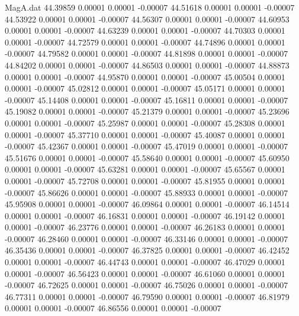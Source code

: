 \begin{filecontents}{MagA.dat}
  44.39859    0.00001    0.00001   -0.00007
  44.51618    0.00001    0.00001   -0.00007
  44.53922    0.00001    0.00001   -0.00007
  44.56307    0.00001    0.00001   -0.00007
  44.60953    0.00001    0.00001   -0.00007
  44.63239    0.00001    0.00001   -0.00007
  44.70303    0.00001    0.00001   -0.00007
  44.72579    0.00001    0.00001   -0.00007
  44.74896    0.00001    0.00001   -0.00007
  44.79582    0.00001    0.00001   -0.00007
  44.81898    0.00001    0.00001   -0.00007
  44.84202    0.00001    0.00001   -0.00007
  44.86503    0.00001    0.00001   -0.00007
  44.88873    0.00001    0.00001   -0.00007
  44.95870    0.00001    0.00001   -0.00007
  45.00504    0.00001    0.00001   -0.00007
  45.02812    0.00001    0.00001   -0.00007
  45.05171    0.00001    0.00001   -0.00007
  45.14408    0.00001    0.00001   -0.00007
  45.16811    0.00001    0.00001   -0.00007
  45.19082    0.00001    0.00001   -0.00007
  45.21379    0.00001    0.00001   -0.00007
  45.23696    0.00001    0.00001   -0.00007
  45.25987    0.00001    0.00001   -0.00007
  45.28308    0.00001    0.00001   -0.00007
  45.37710    0.00001    0.00001   -0.00007
  45.40087    0.00001    0.00001   -0.00007
  45.42367    0.00001    0.00001   -0.00007
  45.47019    0.00001    0.00001   -0.00007
  45.51676    0.00001    0.00001   -0.00007
  45.58640    0.00001    0.00001   -0.00007
  45.60950    0.00001    0.00001   -0.00007
  45.63281    0.00001    0.00001   -0.00007
  45.65567    0.00001    0.00001   -0.00007
  45.72708    0.00001    0.00001   -0.00007
  45.81955    0.00001    0.00001   -0.00007
  45.86626    0.00001    0.00001   -0.00007
  45.88933    0.00001    0.00001   -0.00007
  45.95908    0.00001    0.00001   -0.00007
  46.09864    0.00001    0.00001   -0.00007
  46.14514    0.00001    0.00001   -0.00007
  46.16831    0.00001    0.00001   -0.00007
  46.19142    0.00001    0.00001   -0.00007
  46.23776    0.00001    0.00001   -0.00007
  46.26183    0.00001    0.00001   -0.00007
  46.28460    0.00001    0.00001   -0.00007
  46.33146    0.00001    0.00001   -0.00007
  46.35436    0.00001    0.00001   -0.00007
  46.37825    0.00001    0.00001   -0.00007
  46.42452    0.00001    0.00001   -0.00007
  46.44743    0.00001    0.00001   -0.00007
  46.47029    0.00001    0.00001   -0.00007
  46.56423    0.00001    0.00001   -0.00007
  46.61060    0.00001    0.00001   -0.00007
  46.72625    0.00001    0.00001   -0.00007
  46.75026    0.00001    0.00001   -0.00007
  46.77311    0.00001    0.00001   -0.00007
  46.79590    0.00001    0.00001   -0.00007
  46.81979    0.00001    0.00001   -0.00007
  46.86556    0.00001    0.00001   -0.00007

\end{filecontents}
